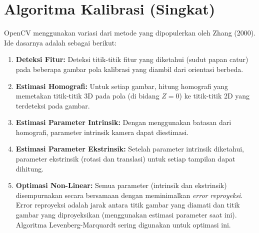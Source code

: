 \documentclass[12pt,a4paper]{article}
\begin{document}
\section{Algoritma Kalibrasi (Singkat)}
OpenCV menggunakan variasi dari metode yang dipopulerkan oleh Zhang (2000). Ide
dasarnya adalah sebagai berikut:
\begin{enumerate}
    \item \textbf{Deteksi Fitur:} Deteksi titik-titik fitur yang diketahui (sudut papan catur) pada beberapa gambar pola kalibrasi yang diambil dari orientasi berbeda.
    \item \textbf{Estimasi Homografi:} Untuk setiap gambar, hitung homografi yang memetakan titik-titik 3D pada pola (di bidang $Z=0$) ke titik-titik 2D yang terdeteksi pada gambar.
    \item \textbf{Estimasi Parameter Intrinsik:} Dengan menggunakan batasan dari homografi, parameter intrinsik kamera dapat diestimasi.
    \item \textbf{Estimasi Parameter Ekstrinsik:} Setelah parameter intrinsik diketahui, parameter ekstrinsik (rotasi dan translasi) untuk setiap tampilan dapat dihitung.
    \item \textbf{Optimasi Non-Linear:} Semua parameter (intrinsik dan ekstrinsik) disempurnakan secara bersamaan dengan meminimalkan \textit{error reproyeksi}. Error reproyeksi adalah jarak antara titik gambar yang diamati dan titik gambar yang diproyeksikan (menggunakan estimasi parameter saat ini). Algoritma Levenberg-Marquardt sering digunakan untuk optimasi ini.
\end{enumerate}
\end{document}
